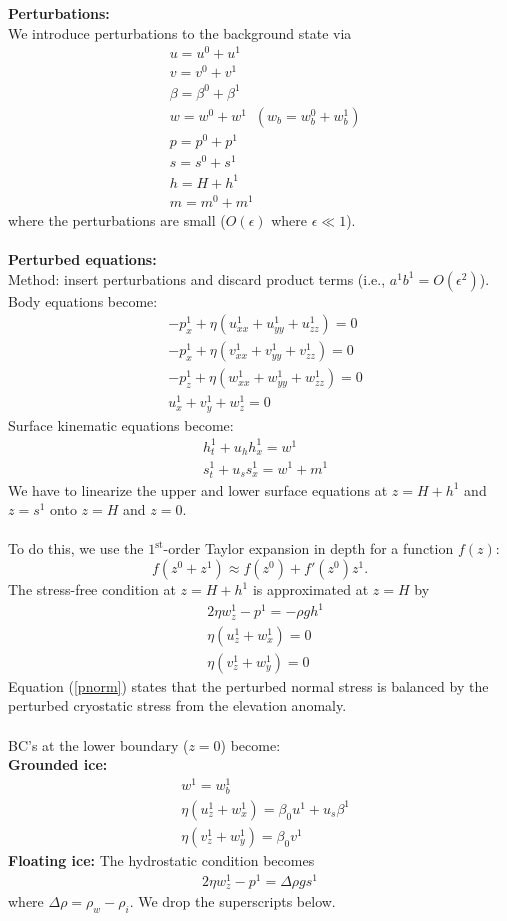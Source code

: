 \documentclass[paper=a4, fontsize=11pt]{article}
\begin{document}
\noindent\textbf{Perturbations:}\\
We introduce perturbations to the background state via
\begin{align}
&u= u^0 +  u^1 \\
&v= v^0 +  v^1 \\
&\beta = \beta^0 + \beta^1 \\
&w =  w^0 + w^1 \;\; (w_b=w_b^0 + w_b^1)\\
&p = p^0 +  p^1\\
&s =  s^0 + s^1 \\
&h = H +  h^1 \\
&m = m^0 + m^1
\end{align}
where the perturbations are small ($O(\epsilon)$ where $\epsilon \ll 1$). \\ \\
\noindent\textbf{Perturbed equations:}\\
Method: insert perturbations and discard product terms (i.e., $a^1b^1=O(\epsilon^2)$).\\
Body equations become:
\begin{align}
&-p_x^1 + \eta (u_{xx}^1 +u_{yy}^1+ u_{zz}^1) = 0 \\
&-p_x^1 + \eta (v_{xx}^1 +v_{yy}^1+ v_{zz}^1) = 0 \\
&-p_z^1 + \eta (w_{xx}^1 +w_{yy}^1+ w_{zz}^1) = 0\\
&u_x^1 + v_y^1 + w_z^1 = 0
\end{align}
Surface kinematic equations become:
\begin{align}
&h_t^1 + u_h h_x^1  = w^1 \label{ht} \\
&s_t^1  + u_s s_x^1 = w^1 + m^1 \label{st}
\end{align}
We have to linearize the upper and lower surface equations at $z=H +  h^1$
and $z= s^1$ onto $z=H$ and $z=0$.
\\ \\
To do this, we
use the $1^\mathrm{st}$-order Taylor expansion in depth for a function $f(z)$:
$$ f(z^0 + z^1) \approx f(z^0) + f'(z^0)z^1. $$
The stress-free condition at $z=H+h^1$ is approximated at $z=H$ by
\begin{align}
&2\eta w_z^1 - p^1 = -\rho g h^1 \label{pnorm} \\
&\eta(u_z^1 +w_x^1) = 0 \\
&\eta(v_z^1 +w_y^1) = 0
\end{align}
Equation (\ref{pnorm}) states that the perturbed normal stress is balanced
by the perturbed cryostatic stress from the elevation anomaly.
\\ \\
BC's at the lower boundary ($z=0$) become:\\
\textbf{Grounded ice:}
\begin{align}
&w^1  = w_b^1\\
&\eta(u_z^1 + w_x^1) = \beta_0 u^1 + u_s\beta^1 \\
&\eta(v_z^1 +w_y^1) = \beta_0 v^1
\end{align}
\textbf{Floating ice:}
The hydrostatic condition becomes
\begin{align}
2\eta w_z^1 - p^1 = \Delta\rho g s^1
\end{align}
where $\Delta\rho = \rho_w-\rho_i$.
We drop the superscripts below.
\end{document}
